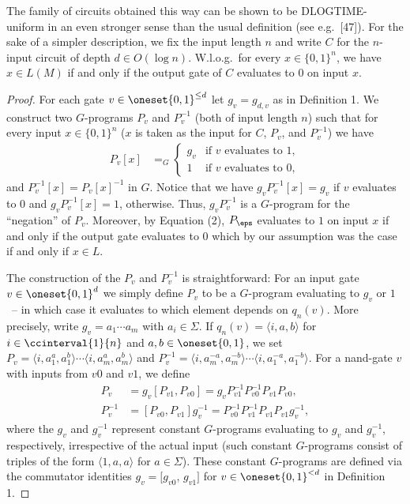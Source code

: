 The family of circuits obtained this way can be shown to be DLOGTIME-uniform in an even stronger sense than the usual definition (see e.g.\ [47]). For the sake of a simpler description, we fix the input length $n$ and write $C$ for the $n$-input circuit of depth $d\in O(\log n)$. W.l.o.g.\ for every $x\in\{0,1\}^n$, we have $x\in L(M)$ if and only if the output gate of $C$ evaluates to $0$ on input $x$.
\begin{proof}
  For each gate $v \in \oneset{0,1}^{\leq d}$ let
  $g_v = g_{d,v}$ as in Definition 1. We construct two $G$-programs $P_v$
  and $P_v^{-1}$ (both of input length $n$) such that for every input $x \in \{0,1\}^n$
  ($x$ is taken as the input for $C$,  $P_v$, and $P_v^{-1}$) we have
  \begin{align}\label{eq:pvdef}\tag{2}
    P_v[x] &=_G \begin{cases}
      g_v &\text{if } v \text{ evaluates to } 1,\\
      1 &\text{if } v \text{ evaluates to } 0, 		
    \end{cases} 
  \end{align}
  and $P_v^{-1}[x] = P_v[x]^{-1}$ in $G$.  Notice that we have
  $g_v P_v^{-1}[x] = g_v$ if $v$ evaluates to $0$ and $g_v P_v^{-1}[x] = 1$,
  otherwise. Thus, $g_v P_v^{-1}$ is a $G$-program for the ``negation''
  of $P_v$. Moreover, by Equation (2), $P_\eps$ evaluates to $1$ on input $x$ if and only if the output gate evaluates to $0$ which by our assumption was the case if and only if  $x \in L$.
	
  The construction of the $P_v$ and $P_v^{-1}$ is straightforward:
  For an input gate $v \in \oneset{0,1}^{d}$ we simply define $P_v$ to be a $G$-program evaluating to $g_v$ or $1$~-- in which case it evaluates to which element depends on $q_n(v)$. %
  More precisely, write $g_v = a_1\cdots a_m$ with $a_i \in \Sigma$. If $q_n(v) = \langle i, a,b\rangle$ for $i \in \ccinterval{1}{n}$ and $a,b \in \oneset{0,1}$, we set 
  $P_v =  \langle i, a_1^a,a_1^b\rangle \cdots  \langle i, a_m^a,a_m^b\rangle$ and $P_v^{-1} =  \langle i, a^{-a}_m,a^{-b}_m\rangle \cdots  \langle i, a^{-a}_1,a^{-b}_1\rangle$.
  For a {\sf nand}-gate $v$ with
  inputs from $v0$ and $v1$, we define
  \begin{align*}
    P_v &= g_v [P_{v1}, P_{v0}]=g_v  P_{v1}^{-1}  P_{v0}^{-1} P_{v1} P_{v0}, \\
    P_v^{-1} &=  [P_{v0}, P_{v1}] g_v^{-1}= P_{v0}^{-1} P_{v1}^{-1}  P_{v1} P_{v1} g_v^{-1},
  \end{align*}
  where the $g_v$  and $g_v^{-1}$ represent constant
  $G$-programs evaluating to $g_v$ and $g_v^{-1}$, respectively, irrespective of the actual input
  (such constant $G$-programs consist of triples of the form $\langle 1, a,a\rangle$ for $a \in \Sigma$). These
  constant $G$-programs are defined via the commutator identities
  $g_v = \bigl[ g_{v0},\, g_{v1} \bigr]$ for $v \in \oneset{0,1}^{< d}$ in
  Definition 1.


\end{proof}
